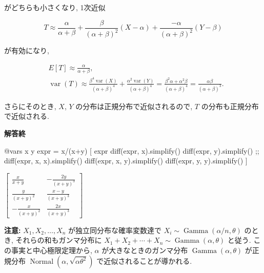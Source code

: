 \documentclass[
  letterpaper,
  DIV=11,
  numbers=noendperiod]{scrartcl}
\newenvironment{Shaded}{\begin{snugshade}}{\end{snugshade}}
\newcommand{\FunctionTok}[1]{\textcolor[rgb]{0.28,0.35,0.67}{#1}}
\newcommand{\NormalTok}[1]{\textcolor[rgb]{0.00,0.23,0.31}{#1}}
\newcommand{\OperatorTok}[1]{\textcolor[rgb]{0.37,0.37,0.37}{#1}}
\newcommand{\PreprocessorTok}[1]{\textcolor[rgb]{0.68,0.00,0.00}{#1}}
\begin{document}
がどちらも小さくなり, 1次近似

\[
T \approx
\frac{\alpha}{\alpha+\beta} +
\frac{\beta}{(\alpha+\beta)^2}(X-\alpha) +
\frac{-\alpha}{(\alpha+\beta)^2}(Y-\beta)
\]

が有効になり,

\[
\begin{aligned}
&
E[T] \approx \frac{\alpha}{\alpha+\beta},
\\ &
\operatorname{var}(T) \approx
\frac{\beta^4 \operatorname{var}(X)}{(\alpha+\beta)^4} +
\frac{\alpha^2 \operatorname{var}(Y)}{(\alpha+\beta)^4} =
\frac{\beta^2\alpha + \alpha^2\beta}{(\alpha+\beta)^4} =
\frac{\alpha\beta}{(\alpha+\beta)^3}.
\end{aligned}
\]

さらにそのとき, \(X\), \(Y\) の分布は正規分布で近似されるので, \(T\)
の分布も正規分布で近似される.

\textbf{解答終}

\begin{Shaded}
\begin{Highlighting}[]
\PreprocessorTok{@vars}\NormalTok{ x y}
\NormalTok{expr }\OperatorTok{=}\NormalTok{ x}\OperatorTok{/}\NormalTok{(x}\OperatorTok{+}\NormalTok{y)}
\NormalTok{[}
\NormalTok{    expr}
    \FunctionTok{diff}\NormalTok{(expr, x).}\FunctionTok{simplify}\NormalTok{()}
    \FunctionTok{diff}\NormalTok{(expr, y).}\FunctionTok{simplify}\NormalTok{()}
\NormalTok{    ;;}
    \FunctionTok{diff}\NormalTok{(expr, x, x).}\FunctionTok{simplify}\NormalTok{()}
    \FunctionTok{diff}\NormalTok{(expr, x, y).}\FunctionTok{simplify}\NormalTok{()}
    \FunctionTok{diff}\NormalTok{(expr, y, y).}\FunctionTok{simplify}\NormalTok{()}
\NormalTok{]}
\end{Highlighting}
\end{Shaded}

$\left[ \begin{array}{rr}\displaystyle \frac{x}{x + y}&\displaystyle - \frac{2 y}{\left(x + y\right)^{3}}\\\displaystyle \frac{y}{\left(x + y\right)^{2}}&\displaystyle \frac{x - y}{\left(x + y\right)^{3}}\\\displaystyle - \frac{x}{\left(x + y\right)^{2}}&\displaystyle \frac{2 x}{\left(x + y\right)^{3}}\end{array}\right]$

\textbf{注意:} \(X_1,X_2,\ldots,X_n\) が独立同分布な確率変数達で
\(X_i\sim\operatorname{Gamma}(\alpha/n, \theta)\) のとき,
それらの和もガンマ分布に
\(X_1+X_2+\cdots+X_n \sim \operatorname{Gamma}(\alpha, \theta)\) と従う.
この事実と中心極限定理から, \(\alpha\) が大きなときのガンマ分布
\(\operatorname{Gamma}(\alpha,\theta)\) が正規分布
\(\operatorname{Normal}(\alpha, \sqrt{\alpha\theta^2})\)
で近似されることが導かれる.
\end{document}
